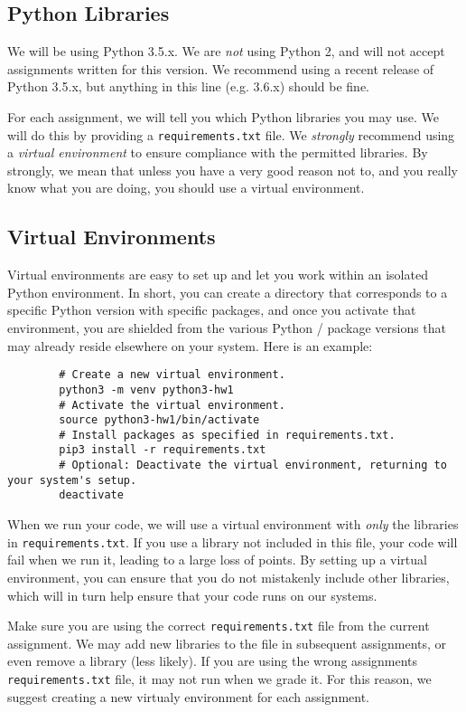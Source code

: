 \documentclass[11pt]{article}
\begin{document}
	\subsection{Python Libraries}
	We will be using Python 3.5.x. We are {\em not} using Python 2, and will not accept assignments written for this version. We recommend using a recent release of Python 3.5.x, but anything in this line (e.g. 3.6.x) should be fine.
	
	For each assignment, we will tell you which Python libraries you may use. We will do this by providing a {\tt requirements.txt} file. We {\em strongly} recommend using a \emph{virtual environment} to ensure compliance with the permitted libraries. By strongly, we mean that unless you have a very good reason not to, and you really know what you are doing, you should use a virtual environment.
	
	\subsection{Virtual Environments}
	Virtual environments are easy to set up and let you work within an isolated Python environment. In short, you can create a directory that corresponds to a specific Python version with specific packages, and once you activate that environment, you are shielded from the various Python / package versions that may already reside elsewhere on your system. Here is an example:
	\begin{footnotesize}
		\begin{verbatim}
		# Create a new virtual environment.
		python3 -m venv python3-hw1
		# Activate the virtual environment.
		source python3-hw1/bin/activate
		# Install packages as specified in requirements.txt.
		pip3 install -r requirements.txt
		# Optional: Deactivate the virtual environment, returning to your system's setup.
		deactivate
		\end{verbatim}
	\end{footnotesize}
	
	When we run your code, we will use a virtual environment with \emph{only} the libraries in \texttt{requirements.txt}. If you use a library not included in this file, your code will fail when we run it, leading to a large loss of points. By setting up a virtual environment, you can ensure that you do not mistakenly include other libraries, which will in turn help ensure that your code runs on our systems.
	
	Make sure you are using the correct {\tt requirements.txt} file from the current assignment. We may add new libraries to the file in subsequent assignments, or even remove a library (less likely). If you are using the wrong assignments {\tt requirements.txt} file, it may not run when we grade it. For this reason, we suggest creating a new virtualy environment for each assignment.
	
\end{document}

